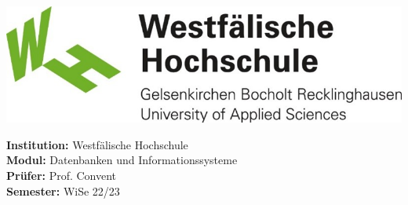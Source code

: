 \begin{titlepage}
    \maketitle
    \vspace{2cm}
    \begin{center}
        \includegraphics[width=\paperwidth/2]{assets/img/whs}
    \end{center}
    \vspace*{\fill}
    \begin{flushleft}
        \Large{\textbf{Institution:} Westfälische Hochschule}\\
        \Large{\textbf{Modul:} Datenbanken und Informationssysteme} \\
        \Large{\textbf{Prüfer:} Prof. Convent}\\
        \Large{\textbf{Semester:} WiSe 22/23}
    \end{flushleft}
\end{titlepage}
